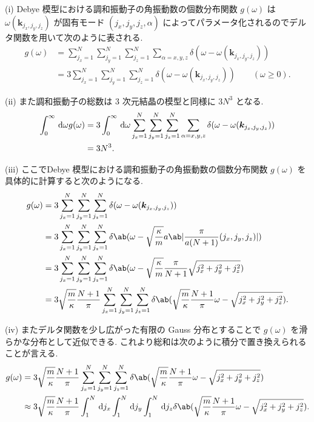 \documentclass[uplatex,diffipdfmx,a4paper,11pt]{jlreq}
\theoremstyle{definition}
\begin{document}
(i) Debye 模型における調和振動子の角振動数の個数分布関数 $g(\omega)$ は $\omega(\bm{k}_{j_x, j_y, j_z})$ が固有モード $(j_x, j_y, j_z, \alpha)$ によってパラメータ化されるのでデルタ関数を用いて次のように表される.
\begin{align}
  g(\omega) & = \sum_{j_x=1}^{N}\sum_{j_y=1}^{N}\sum_{j_z=1}^{N}\sum_{\alpha=x,y,z}\delta(\omega - \omega(\bm{k}_{j_x,j_y,j_z}))      \\
            & = 3\sum_{j_x=1}^{N}\sum_{j_y=1}^{N}\sum_{j_z=1}^{N}\delta(\omega - \omega(\bm{k}_{j_x,j_y,j_z})) \qquad (\omega\geq 0).
\end{align}

(ii) また調和振動子の総数は 3 次元結晶の模型と同様に $3N^3$ となる.
\begin{align}
  \int_0^\infty\dl{\omega}g(\omega) & = 3\int_0^\infty\dl{\omega}\sum_{j_x=1}^{N}\sum_{j_y=1}^{N}\sum_{j_z=1}^{N}\sum_{\alpha=x,y,z}\delta(\omega - \omega(\bm{k}_{j_x,j_y,j_z})) \\
                                    & = 3N^3.
\end{align}

(iii) ここでDebye 模型における調和振動子の角振動数の個数分布関数 $g(\omega)$ を具体的に計算すると次のようになる.
\begin{align}
  g(\omega) & = 3\sum_{j_x=1}^{N}\sum_{j_y=1}^{N}\sum_{j_z=1}^{N}\delta(\omega - \omega(\bm{k}_{j_x,j_y,j_z}))                                                                                 \\
            & = 3\sum_{j_x=1}^{N}\sum_{j_y=1}^{N}\sum_{j_z=1}^{N}\delta\ab(\omega - \sqrt{\frac{\kappa}{m}}a\ab|\frac{\pi}{a(N+1)}(j_x,j_y,j_z)|)                                              \\
            & = 3\sum_{j_x=1}^{N}\sum_{j_y=1}^{N}\sum_{j_z=1}^{N}\delta\ab(\omega - \sqrt{\frac{\kappa}{m}}\frac{\pi}{N+1}\sqrt{j_x^2 + j_y^2 + j_z^2})                                        \\
            & = 3\sqrt{\frac{m}{\kappa}}\frac{N+1}{\pi}\sum_{j_x=1}^{N}\sum_{j_y=1}^{N}\sum_{j_z=1}^{N}\delta\ab(\sqrt{\frac{m}{\kappa}}\frac{N+1}{\pi}\omega - \sqrt{j_x^2 + j_y^2 + j_z^2}).
\end{align}

(iv) またデルタ関数を少し広がった有限の Gauss 分布とすることで $g(\omega)$ を滑らかな分布として近似できる. これより総和は次のように積分で置き換えられることが言える.
\begin{align}
  g(\omega) & = 3\sqrt{\frac{m}{\kappa}}\frac{N+1}{\pi}\sum_{j_x=1}^{N}\sum_{j_y=1}^{N}\sum_{j_z=1}^{N}\delta\ab(\sqrt{\frac{m}{\kappa}}\frac{N+1}{\pi}\omega - \sqrt{j_x^2 + j_y^2 + j_z^2})                    \\
            & \approx 3\sqrt{\frac{m}{\kappa}}\frac{N+1}{\pi}\int_{1}^{N}\dl{j_x}\int_{1}^{N}\dl{j_y}\int_{1}^{N}\dl{j_z}\delta\ab(\sqrt{\frac{m}{\kappa}}\frac{N+1}{\pi}\omega - \sqrt{j_x^2 + j_y^2 + j_z^2}).
\end{align}
\end{document}
